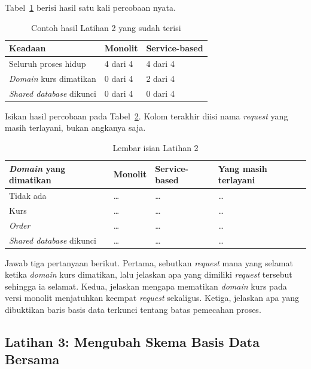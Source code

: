 Tabel~\ref{tab:lat2layanan-contoh} berisi hasil satu kali percobaan nyata.

\begin{table}[htbp]
  \centering
  \caption{Contoh hasil Latihan 2 yang sudah terisi}
  \label{tab:lat2layanan-contoh}
  \begin{tabularx}{\textwidth}{|X|l|l|}
    \hline
    \textbf{Keadaan} & \textbf{Monolit} & \textbf{Service-based} \\
    \hline
    Seluruh proses hidup & 4 dari 4 & 4 dari 4 \\
    \hline
    \textit{Domain} kurs dimatikan & 0 dari 4 & 2 dari 4 \\
    \hline
    \textit{Shared database} dikunci & 0 dari 4 & 0 dari 4 \\
    \hline
  \end{tabularx}
\end{table}

Isikan hasil percobaan pada Tabel~\ref{tab:lat2layanan-hasil}. Kolom terakhir
diisi nama \textit{request} yang masih terlayani, bukan angkanya saja.

\begin{table}[htbp]
  \centering
  \caption{Lembar isian Latihan 2}
  \label{tab:lat2layanan-hasil}
  \begin{tabularx}{\textwidth}{|l|l|l|X|}
    \hline
    \textbf{\textit{Domain} yang dimatikan} & \textbf{Monolit} & \textbf{Service-based} & \textbf{Yang masih terlayani} \\
    \hline
    Tidak ada & \dots & \dots & \dots \\
    \hline
    Kurs & \dots & \dots & \dots \\
    \hline
    \textit{Order} & \dots & \dots & \dots \\
    \hline
    \textit{Shared database} dikunci & \dots & \dots & \dots \\
    \hline
  \end{tabularx}
\end{table}

Jawab tiga pertanyaan berikut. Pertama, sebutkan \textit{request} mana yang selamat
ketika \textit{domain} kurs dimatikan, lalu jelaskan apa yang dimiliki \textit{request}
tersebut sehingga ia selamat. Kedua, jelaskan mengapa mematikan \textit{domain} kurs
pada versi monolit menjatuhkan keempat \textit{request} sekaligus. Ketiga, jelaskan
apa yang dibuktikan baris basis data terkunci tentang batas pemecahan proses.

\subsection*{Latihan 3: Mengubah Skema Basis Data Bersama}

